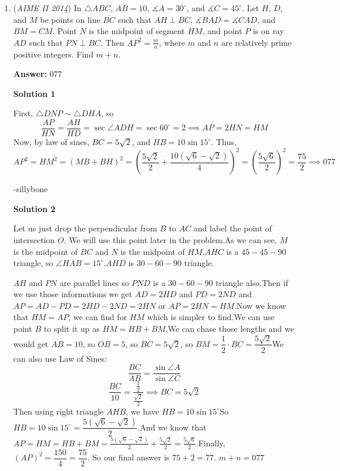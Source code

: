 \begin{enumerate}
 


	\item (\textit{AIME II 2014}) In $\triangle ABC$, $AB=10$, $\measuredangle A=30^{\circ}$, and $\measuredangle C=45^{\circ}$. Let $H$, $D$, and $M$ be points on line $\overline{BC}$ such that $AH\perp BC$, $\measuredangle BAD=\measuredangle CAD$, and $BM=CM$. Point $N$ is the midpoint of segment $HM$, and point $P$ is on ray $AD$ such that $PN\perp BC$. Then $AP^2=\frac{m}{n}$, where $m$ and $n$ are relatively prime positive integers. Find $m+n$.


 
 \textbf{Answer: }077



\textbf{Solution 1}

First, $\triangle DNP \sim \triangle DHA$, so 
 \[\frac{AP}{HN}=\frac{AH}{HD} = \sec \angle ADH = \sec 60^\circ= 2 \implies AP = 2HN = HM\]Now, by law of sines, $BC = 5\sqrt{2}$, and $HB=10\sin 15^\circ$. Thus, 
 \[AP^2 = HM^2 = (MB+BH)^2 = \left(\frac{5\sqrt{2}}{2}+\frac{10(\sqrt{6}-\sqrt{2})}{4} \right)^2 = \left(\frac{5\sqrt{6}}{2} \right)^2 = \frac{75}{2} \implies \boxed{077}\]

 -sillybone

 



\textbf{Solution 2}

Let us just drop the perpendicular from $B$ to $AC$ and label the point of intersection $O$. We will use this point later in the problem.As we can see, $M$ is the midpoint of $BC$ and $N$ is the midpoint of $HM$,$AHC$ is a $45-45-90$ triangle, so $\angle{HAB}=15^\circ$.$AHD$ is $30-60-90$ triangle.

 $AH$ and $PN$ are parallel lines so $PND$ is a $30-60-90$ triangle also.Then if we use those informations we get $AD=2HD$ and $PD=2ND$ and $AP=AD-PD=2HD-2ND=2HN$ or $AP=2HN=HM$.Now we know  that $HM=AP$, we can find for $HM$ which is simpler to find.We can use point $B$ to split it up as $HM=HB+BM$,We can chase those lengths and we would get $AB=10$, so $OB=5$, so $BC=5\sqrt{2}$, so $BM=\dfrac{1}{2} \cdot BC=\dfrac{5\sqrt{2}}{2}$We can also use Law of Sines:
 \[\frac{BC}{AB}=\frac{\sin\angle A}{\sin\angle C}\]
 \[\frac{BC}{10}=\frac{\frac{1}{2}}{\frac{\sqrt{2}}{2}}\implies BC=5\sqrt{2}\]Then using right triangle $AHB$, we have $HB=10 \sin 15^\circ$So $HB=10 \sin 15^\circ=\dfrac{5(\sqrt{6}-\sqrt{2})}{2}$.And we know that $AP = HM = HB + BM = \frac{5(\sqrt6-\sqrt2)}{2} + \frac{5\sqrt2}{2} = \frac{5\sqrt6}{2}$.Finally, $(AP)^2=\dfrac{150}{4}=\dfrac{75}{2}$. So our final answer is $75+2=77$. $m+n=\boxed{077}$


\end{enumerate}
